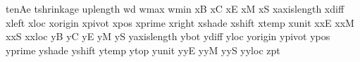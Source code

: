\newdimen\!tenAe                %
\newdimen\!tshrinkage           %
\newdimen\!uplength             %
\newdimen\!wd                   %
\newdimen\!wmax                 %
\newdimen\!wmin                 %
\newdimen\!xB                   %
\newdimen\!xC                   %
\newdimen\!xE                   %
\newdimen\!xM                   %
\newdimen\!xS                   %
\newdimen\!xaxislength          %
\newdimen\!xdiff                %
\newdimen\!xleft                %
\newdimen\!xloc                 %
\newdimen\!xorigin              %
\newdimen\!xpivot               %
\newdimen\!xpos                 %
\newdimen\!xprime               %
\newdimen\!xright               %
\newdimen\!xshade               %
\newdimen\!xshift               %
\newdimen\!xtemp                %
\newdimen\!xunit                %
\newdimen\!xxE                  %
\newdimen\!xxM                  %
\newdimen\!xxS                  %
\newdimen\!xxloc                %
\newdimen\!yB                   %
\newdimen\!yC                   %
\newdimen\!yE                   %
\newdimen\!yM                   %
\newdimen\!yS                   %
\newdimen\!yaxislength          %
\newdimen\!ybot                 %
\newdimen\!ydiff                %
\newdimen\!yloc                 %
\newdimen\!yorigin              %
\newdimen\!ypivot               %
\newdimen\!ypos                 %
\newdimen\!yprime               %
\newdimen\!yshade               %
\newdimen\!yshift               %
\newdimen\!ytemp                %
\newdimen\!ytop                 %
\newdimen\!yunit                %
\newdimen\!yyE                  %
\newdimen\!yyM                  %
\newdimen\!yyS                  %
\newdimen\!yyloc                %
\newdimen\!zpt                  %

